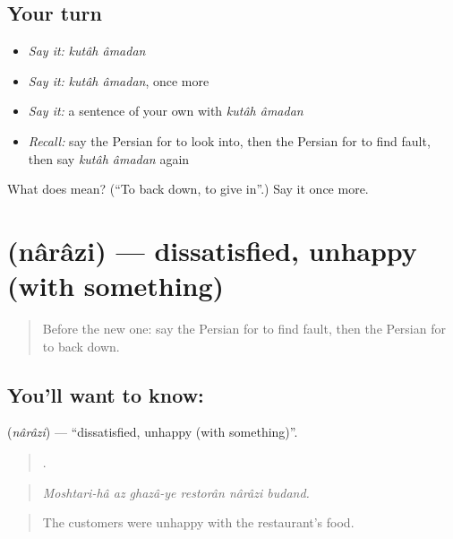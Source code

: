 \subsection*{Your turn}
\begin{itemize}
\raggedright
  \item \emph{Say it:} \emph{kutâh âmadan}
  \item \emph{Say it:} \emph{kutâh âmadan}, once more
  \item \emph{Say it:} a sentence of your own with \emph{kutâh âmadan}
  \item \emph{Recall:} say the Persian for to look into, then the Persian for to find fault, then say \emph{kutâh âmadan} again
\end{itemize}

\begin{tcolorbox}[breakable,colback=teal!4,colframe=teal!35!black,title={Before you move on}]
What does   mean? (\textquotedblleft{}To back down, to give in\textquotedblright{}.) Say it once more.
\end{tcolorbox}
\section[\texorpdfstring{\fa{ناراضی} (nârâzi)}{ناراضی (nârâzi)}]{ (nârâzi) — dissatisfied, unhappy (with something)}

\label{lesson:FA-C441-narazi}



\begin{quote}
Before the new one: say the Persian for to find fault, then the Persian for to back down.
\end{quote}

\subsection*{You'll want to know: }
\textbf{} (\emph{nârâzi}) — \textquotedblleft{}dissatisfied, unhappy (with something)\textquotedblright{}.

\begin{quote}
     .
\end{quote}

\begin{quote}
\emph{Moshtari-hâ az ghazâ-ye restorân nârâzi budand.}
\end{quote}

\begin{quote}
The customers were unhappy with the restaurant's food.
\end{quote}

